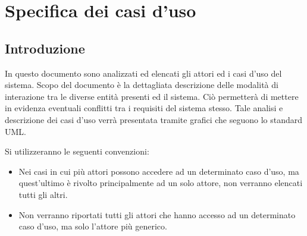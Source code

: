 \chapter{Specifica dei casi d'uso}

\section{Introduzione}
In questo documento sono analizzati ed elencati gli attori ed i casi d'uso del sistema.
Scopo del documento è la dettagliata descrizione delle modalità di interazione tra le diverse entità presenti ed il sistema.
Ciò permetterà di mettere in evidenza eventuali conflitti tra i requisiti del sistema stesso.
Tale analisi e descrizione dei casi d'uso verrà presentata tramite grafici che seguono lo standard UML.

\noindent
Si utilizzeranno le seguenti convenzioni:
\begin{itemize}
	\item Nei casi in cui più attori possono accedere ad un determinato caso d’uso, ma quest'ultimo è rivolto principalmente ad un solo attore, non verranno elencati tutti gli altri.

	\item Non verranno riportati tutti gli attori che hanno accesso ad un determinato caso d'uso, ma solo l'attore più generico.
\end{itemize}

